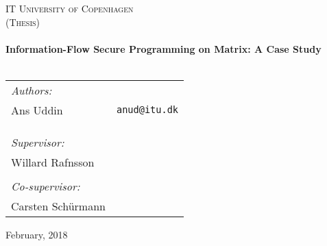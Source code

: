 \begin{center}
  \thispagestyle{empty}

  \textsc{\LARGE IT University of Copenhagen}\\[0.5cm]
  \textsc{\Large  (Thesis)}\\[2cm]

  \HRule\\[0.4cm]
  {\huge \bfseries Information-Flow Secure Programming on Matrix: A Case Study \\ [0.4cm]}
  \HRule\\[3cm]

  \begin{tabular}{lr}
  	\textit{Authors:} \\
    Ans Uddin                     & \texttt{anud@itu.dk} \\
    \\
    \\
    \\
    \textit{Supervisor:}\\
    Willard Rafnsson \\
    \\
    \textit{Co-supervisor:}\\
    Carsten Schürmann\\
  \end{tabular}

  \vfill
  {\large February, 2018}
\end{center}
